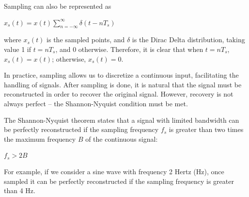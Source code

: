 \documentclass{article}
\begin{document}
Sampling can also be represented as 
\begin{center}
    \begin{math}
        x_s(t) = x(t) \displaystyle\sum_{n=-\infty}^{\infty} \delta (t-nT_s)
    \end{math}  
\end{center}
where $x_s(t)$ is the sampled points, and $\delta$ is the Dirac Delta distribution, taking value 1 if $t=nT_s$, and 0 otherwise.
Therefore, it is clear that when $t=nT_s$, $x_s(t) = x(t)$; otherwise, $x_s(t) = 0$. 

In practice, sampling allows us to discretize a continuous input, facilitating the handling of signals. 
After sampling is done, it is natural that the signal must be reconstructed in order to recover the original signal.
However, recovery is not always perfect -- the Shannon-Nyquist condition must be met.

The Shannon-Nyquist theorem states that a signal with limited bandwidth can be perfectly reconstructed if the sampling frequency $f_s$ is greater than two times the maximum frequency $B$ of the continuous signal:
\begin{center}
    \begin{math}
        f_s > 2B
    \end{math}  
\end{center}
For example, if we consider a sine wave with frequency 2 Hertz (Hz), once sampled it can be perfectly reconstructed if the sampling frequency is greater than 4 Hz.
\end{document}
